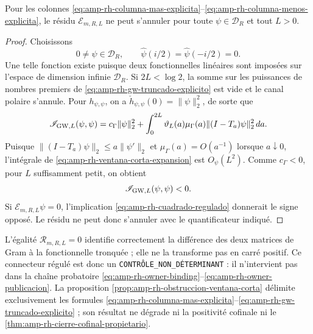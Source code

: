 \begin{proposition}
\label{prop:amp-rh-obstruccion-ventana-corta}
Pour les colonnes \eqref{eq:amp-rh-columna-mas-explicita}--\eqref{eq:amp-rh-columna-menos-explicita}, le résidu \(\mathcal E_{m,R,L}\) ne peut s'annuler pour toute \(\psi\in\mathcal D_R\) et tout \(L>0\).
\end{proposition}

\begin{proof}
Choisissons
\[
 0\ne\psi\in\mathcal D_R,\qquad
 \widehat\psi(i/2)=\widehat\psi(-i/2)=0.
\]
Une telle fonction existe puisque deux fonctionnelles linéaires sont imposées sur l'espace de dimension infinie \(\mathcal D_R\). Si \(2L<\log2\), la somme sur les puissances de nombres premiers de \eqref{eq:amp-rh-gw-truncado-explicito} est vide et le canal polaire s'annule. Pour \(h_{\psi,\psi}\), on a \(\check h_{\psi,\psi}(0)=\|\psi\|_2^2\), de sorte que
\begin{equation}\label{eq:amp-rh-ventana-corta-expansion}
 \mathscr I_{{\rm GW},L}(\psi,\psi)
 =c_\Gamma\|\psi\|_2^2+
 \int_0^{2L}\vartheta_L(a)\mu_\Gamma(a)
       \|(I-T_a)\psi\|_2^2\,da .
\end{equation}
Puisque \(\|(I-T_a)\psi\|_2\leq a\|\psi'\|_2\) et \(\mu_\Gamma(a)=O(a^{-1})\) lorsque \(a\downarrow0\), l'intégrale de \eqref{eq:amp-rh-ventana-corta-expansion} est \(O_\psi(L^2)\). Comme \(c_\Gamma<0\), pour \(L\) suffisamment petit, on obtient
\[
 \mathscr I_{{\rm GW},L}(\psi,\psi)<0.
\]
Si \(\mathcal E_{m,R,L}\psi=0\), l'implication \eqref{eq:amp-rh-cuadrado-regulado} donnerait le signe opposé. Le résidu ne peut donc s'annuler avec le quantificateur indiqué.
\end{proof}

L'égalité \(\mathcal R_{m,R,L}=0\) identifie correctement la différence des deux matrices de Gram à la fonctionnelle tronquée ; elle ne la transforme pas en carré positif. Ce connecteur régulé est donc un \texttt{CONTRÔLE\_NON\_DÉTERMINANT} : il n'intervient pas dans la chaîne probatoire \eqref{eq:amp-rh-owner-binding}--\eqref{eq:amp-rh-owner-publicacion}. La proposition \ref{prop:amp-rh-obstruccion-ventana-corta} délimite exclusivement les formules \eqref{eq:amp-rh-columna-mas-explicita}--\eqref{eq:amp-rh-gw-truncado-explicito} ; son résultat ne dégrade ni la positivité cofinale ni le \cref{thm:amp-rh-cierre-cofinal-propietario}.
